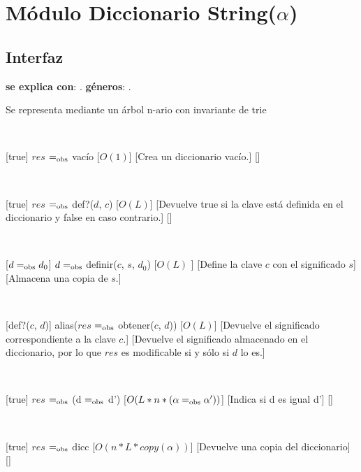 \section{Módulo Diccionario String($\alpha$)}

\subsection{Interfaz}

\textbf{se explica con}: .
\textbf{géneros}: .

Se representa mediante un árbol n-ario con invariante de trie

~

%
[true]
{$res$ $=_{\mathrm{obs}}$ vacío}
[$O(1)$]
[Crea un diccionario vacío.]
[]

~

[true]
{$res$ $=_{\mathrm{obs}}$ def?($d$, $c$)}
[$O(L)$]
[Devuelve true si la clave está definida en el diccionario y false en caso contrario.]
[]

~

[$ d =_{\mathrm{obs}} d_0 $]
{$ d =_{\mathrm{obs}}$ definir($c$, $s$, $d_0$)}
[$O(L)$ ]
[Define la clave $c$ con el significado $s$]
[Almacena una copia de $s$.]

~

[def?($c$, $d$)]
{alias($res$ $=_{\mathrm{obs}}$ obtener($c$, $d$))}
[$O(L)$]
[Devuelve el significado correspondiente a la clave $c$.]
[Devuelve el significado almacenado en el diccionario, por lo que $res$ es modificable si y sólo si $d$ lo es.]

~

[true]
{$res$ $=_{\mathrm{obs}}$ (d $=_{\mathrm{obs}}$ d')}
[$O(L*n*(\alpha  =_{\mathrm{obs}} \alpha'))$]
[Indica si d es igual d']
[]

~

[true]
{$res$ $=_{\mathrm{obs}}$ dicc}
[$O(n * L * copy(\alpha))$]
[Devuelve una copia del diccionario]
[]

